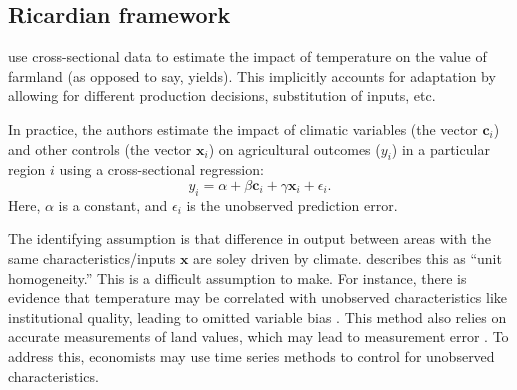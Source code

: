 \documentclass[10 pt]{article}
\newcommand{\cc}{\mathbf{c}}
\newcommand{\xx}{\mathbf{x}}
\begin{document}

\subsection{Ricardian framework}

\begin{outline}


\textcite{MNS94} use cross-sectional data to estimate the impact of temperature on the value of farmland (as opposed to say, yields).
This implicitly accounts for adaptation by allowing for different production decisions, substitution of inputs, etc. 




In practice, the authors estimate the impact of climatic variables (the vector $\cc_i$) and other controls (the vector $\xx_i$) on agricultural outcomes ($y_i$) in a particular region $i$ using a cross-sectional regression:
\begin{equation}
	y_i = \alpha + \beta \cc_i + \gamma \xx_i + \epsilon_i.
\end{equation}
Here, $\alpha$ is a constant, and $\epsilon_i$ is the unobserved prediction error. 

The identifying assumption is that difference in output between areas with the same characteristics/inputs $\xx$ are soley driven by climate. 
\textcite{H16} describes this as ``unit homogeneity.''
This is a difficult assumption to make. 
For instance, there is evidence that temperature may be correlated with unobserved characteristics like institutional quality, leading to omitted variable bias \parencite{AJR02}. 
This method also relies on accurate measurements of land values, which may lead to measurement error \parencite{DG07}.
To address this, economists may use time series methods to control for unobserved characteristics.


\end{outline}
\end{document}
